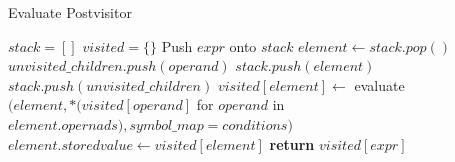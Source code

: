 \documentclass{article}
\begin{document}
\begin{algorithm}
\caption{Evaluate Postvisitor}\label{evalpostvisitor}
\begin{algorithmic}[1]
\State $stack = []$
\State $visited = \{\}$
\State Push $expr$ onto $stack$
\State $element \gets stack.pop()$
\State $unvisited\_children.push(operand)$
\EndIf
\EndFor
{}
\State $stack.push(element)$
\State $stack.push(unvisited\_children)$
\Else
\State $visited[element] \gets$ evaluate$(element, *(visited[operand]$ for $operand$ in $element.opernads), symbol\_map = conditions)$
\State $element.storedvalue \gets visited[element]$
\EndIf
\EndWhile\label{euclidendwhile}
\State \textbf{return} $visited[expr]$
\EndProcedure
\end{algorithmic}
\end{algorithm}
\end{document}
